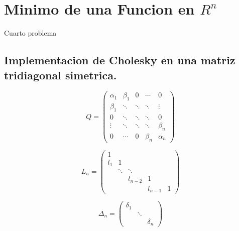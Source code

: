 \documentclass{article}
\begin{document}
    \section{Minimo de una Funcion en $R^n$}
    Cuarto problema

    \subsection{}

    \subsection{}

    \subsection{Implementacion de Cholesky en una matriz tridiagonal simetrica.}
    \begin{equation*}
        Q = \begin{pmatrix} 
                \alpha_1 & \beta_1 &    0   & \cdots  &   0     \\ 
                \beta_1  & \ddots  & \ddots & \ddots  & \vdots  \\
                  0      & \ddots  & \ddots & \ddots  &   0     \\
                \vdots   & \ddots  & \ddots & \ddots  & \beta_n \\
                  0      & \cdots  &    0   & \beta_n & \alpha_n
            \end{pmatrix}
    \end{equation*}

    \begin{equation*}
        L_{n} = \begin{pmatrix} 
                1   &        &         &         &   \\ 
                l_1 &   1    &         &         &   \\
                    & \ddots & \ddots  &         &   \\
                    &        & l_{n-2} &    1    &   \\
                    &        &         & l_{n-1} & 1
            \end{pmatrix}
    \end{equation*}

    \begin{equation*}
        \Delta_n = \begin{pmatrix} 
                \delta_1 &        &          \\ 
                         & \ddots &          \\
                         &        & \delta_n
            \end{pmatrix}
    \end{equation*}
\end{document}

